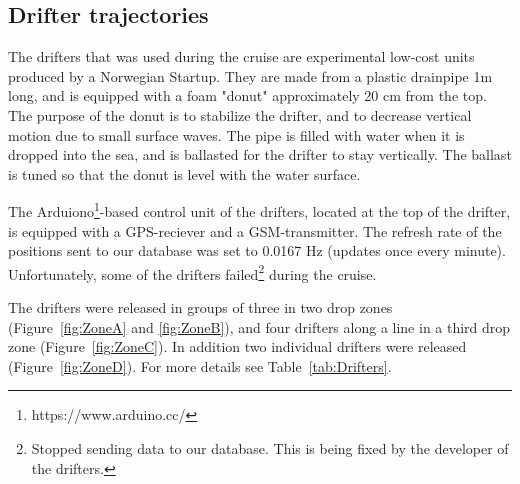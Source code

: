 \documentclass[12pt,a4paper,english]{article}
\begin{document}
\subsection{Drifter trajectories}
The drifters that was used during the cruise are experimental low-cost units produced by a Norwegian Startup. They are made from a plastic drainpipe 1m long, and is equipped with a foam "donut" approximately 20 cm from the top. The purpose of the donut is to stabilize the drifter, and to decrease vertical motion due to small surface waves. The pipe is filled with water when it is dropped into the sea, and is  ballasted for the drifter to stay vertically. The ballast is tuned so that the donut is level with the water surface.

The Arduiono\footnote{https://www.arduino.cc/}-based control unit of the drifters, located at the top of the drifter, is equipped with a GPS-reciever and a GSM-transmitter. The refresh rate of the positions sent to our database was set to 0.0167 Hz (updates once every minute). Unfortunately, some of the drifters failed\footnote{Stopped sending data to our database. This is being fixed by the developer of the drifters.} during the cruise.

The drifters were released in groups of three in two drop zones (Figure~\ref{fig:ZoneA} and \ref{fig:ZoneB}), and four drifters along a line in a third drop zone (Figure~\ref{fig:ZoneC}). In addition two individual drifters were released (Figure~\ref{fig:ZoneD}). For more details see Table~\ref{tab:Drifters}.
\end{document}
